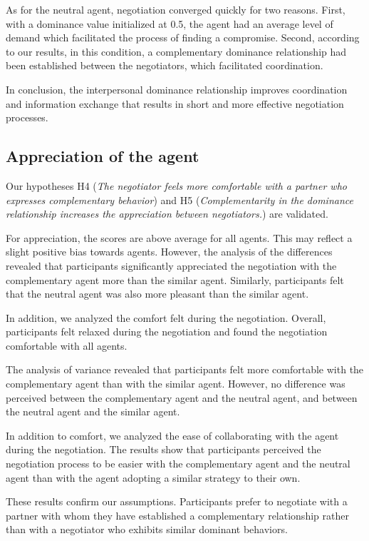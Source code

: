 \documentclass[10pt, a4paper]{article} %
\begin{document}
As for the neutral agent, negotiation converged quickly for two reasons. First, with a dominance value initialized at 0.5, the agent had an average level of demand which facilitated the process of finding a compromise. 
Second, according to our results, in this condition, a complementary dominance relationship had been established between the negotiators, which facilitated coordination. 

In conclusion, the interpersonal dominance relationship improves coordination and information exchange that results in short and more effective negotiation processes.

\subsection{Appreciation of the agent}
Our hypotheses H4 (\textit{The negotiator feels more comfortable with a partner who expresses complementary behavior}) and H5 (\textit{Complementarity in the dominance relationship increases the appreciation between negotiators.}) are validated. 

For appreciation, the scores are above average for all agents. This may reflect a slight positive bias towards agents. However, the analysis of the differences revealed that participants significantly appreciated the negotiation with the complementary agent more than the similar agent. Similarly, participants felt that the neutral agent was also more pleasant than the similar agent. 

In addition, we analyzed the comfort felt during the negotiation. Overall, participants felt relaxed during the negotiation and found the negotiation comfortable with all agents.  

The analysis of variance revealed that participants felt more comfortable with the complementary agent than with the similar agent. However, no difference was perceived between the complementary agent and the neutral agent, and between the neutral agent and the similar agent.

In addition to comfort, we analyzed the ease of collaborating with the agent during the negotiation. The results show that participants perceived the negotiation process to be easier with the complementary agent and the neutral agent than with the agent adopting a similar strategy to their own. 

These results confirm our assumptions. Participants prefer to negotiate with a partner with whom they have established a complementary relationship rather than with a negotiator who exhibits similar dominant behaviors. 
\end{document}
